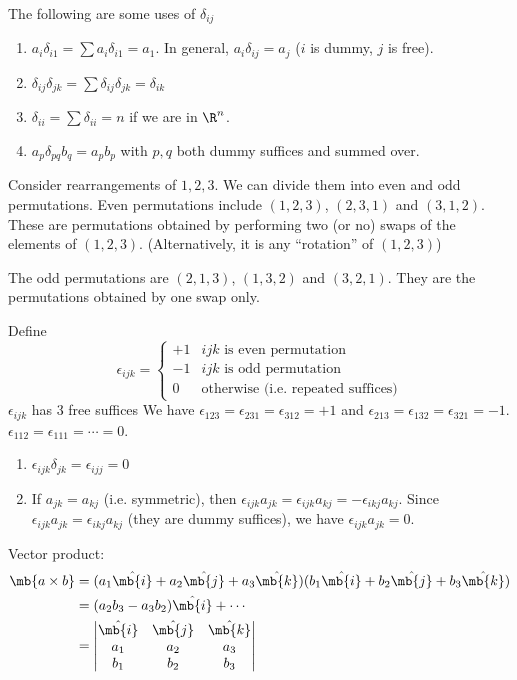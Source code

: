 \documentclass[a4paper]{article}
\begin{document}
\begin{eg}
  The following are some uses of $\delta_{ij}$
  \begin{enumerate}
  \item $a_i\delta_{i1} = \sum a_i\delta_{i1} = a_1$. In general, $a_i\delta_{ij} = a_j$ ($i$ is dummy, $j$ is free).
  \item $\delta_{ij}\delta_{jk} = \sum\delta_{ij}\delta_{jk} = \delta_{ik}$
  \item $\delta_{ii} = \sum \delta_{ii} = n$ if we are in $\R^n$.
  \item $a_p\delta_{pq}b_q = a_pb_p$ with $p, q$ both dummy suffices and summed over.
  \end{enumerate}
\end{eg}

\begin{defi}
  Consider rearrangements of $1, 2, 3$. We can divide them into even and odd permutations. Even permutations include $(1, 2, 3)$, $(2, 3, 1)$ and $(3, 1, 2)$. These are permutations obtained by performing two (or no) swaps of the elements of $(1, 2, 3)$. (Alternatively, it is any ``rotation'' of $(1, 2, 3)$)

  The odd permutations are $(2, 1, 3)$, $(1, 3, 2)$ and $(3, 2, 1)$. They are the permutations obtained by one swap only.

  Define
  \[
  \epsilon_{ijk} =
  \begin{cases}
    +1 & ijk \text{ is even permutation}\\
    -1 & ijk\text{ is odd permutation}\\
    0 & \text{otherwise (i.e. repeated suffices)}
  \end{cases}
  \]
  $\epsilon_{ijk}$ has 3 free suffices
 We have $\epsilon_{123} = \epsilon_{231} = \epsilon_{312} = +1$ and $\epsilon_{213} = \epsilon_{132} = \epsilon_{321} = -1$. $\epsilon_{112} = \epsilon_{111} = \cdots = 0$.
\end{defi}
\note
\begin{enumerate}
\item $\epsilon_{ijk}\delta_{jk} = \epsilon_{ijj} = 0$
\item If $a_{jk} = a_{kj}$ (i.e. symmetric), then $\epsilon_{ijk}a_{jk} = \epsilon_{ijk}a_{kj} = -\epsilon_{ikj}a_{kj}$. Since $\epsilon_{ijk}a_{jk} = \epsilon_{ikj}a_{kj}$ (they are dummy suffices), we have $\epsilon_{ijk}a_{jk} = 0$.
\end{enumerate}

Vector product:
\begin{align*}
\mb{a\times b} &= (a_1\hat{\mb{i}} + a_2\hat{\mb{j}} + a_3\hat{\mb{k}})(b_1\hat{\mb{i}} + b_2\hat{\mb{j}} + b_3\hat{\mb{k}})\\
&= (a_2b_3 - a_3b_2)\hat{\mb{i}} + \cdots\\
&= \begin{vmatrix} \hat{\mb{i}} & \hat{\mb{j}} & \hat{\mb{k}}\\
  a_1 & a_2 & a_3\\
  b_1 & b_2 & b_3\\
\end{vmatrix}
\end{align*}
\end{document}

